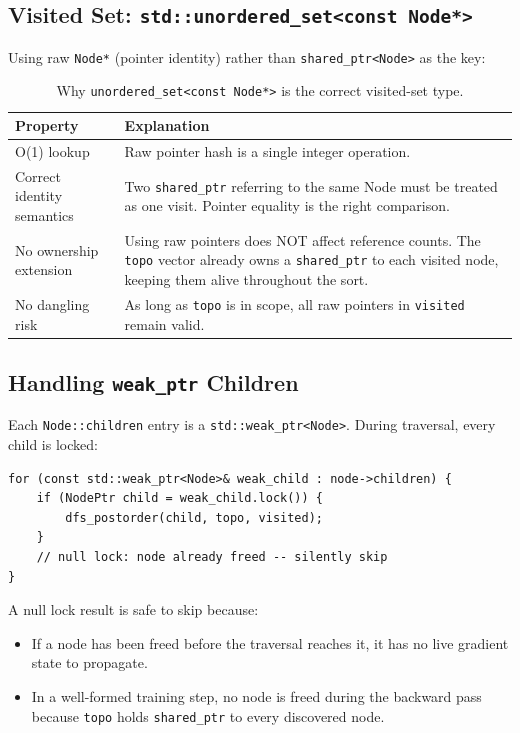 \documentclass[12pt, a4paper]{article}
\begin{document}
\subsection{Visited Set: \texttt{std::unordered\_set<const Node*>}}

Using raw \texttt{Node*} (pointer identity) rather than
\texttt{shared\_ptr<Node>} as the key:

\begin{table}[!ht]
\centering
\renewcommand{\arraystretch}{1.35}
\begin{tabularx}{\textwidth}{@{} l L @{}}
\toprule
\textbf{Property} & \textbf{Explanation} \\
\midrule
O(1) lookup
  & Raw pointer hash is a single integer operation. \\
Correct identity semantics
  & Two \texttt{shared\_ptr} referring to the same Node must be treated as
    one visit.  Pointer equality is the right comparison. \\
No ownership extension
  & Using raw pointers does NOT affect reference counts.  The \texttt{topo}
    vector already owns a \texttt{shared\_ptr} to each visited node,
    keeping them alive throughout the sort. \\
No dangling risk
  & As long as \texttt{topo} is in scope, all raw pointers in
    \texttt{visited} remain valid. \\
\bottomrule
\end{tabularx}
\caption{Why \texttt{unordered\_set<const Node*>} is the correct visited-set type.}
\end{table}

\subsection{Handling \texttt{weak\_ptr} Children}

Each \texttt{Node::children} entry is a \texttt{std::weak\_ptr<Node>}.
During traversal, every child is locked:

\begin{lstlisting}[caption={Safe weak\_ptr locking in dfs\_postorder}]
for (const std::weak_ptr<Node>& weak_child : node->children) {
    if (NodePtr child = weak_child.lock()) {
        dfs_postorder(child, topo, visited);
    }
    // null lock: node already freed -- silently skip
}
\end{lstlisting}

A null lock result is safe to skip because:
\begin{itemize}
  \item If a node has been freed before the traversal reaches it, it has no
        live gradient state to propagate.
  \item In a well-formed training step, no node is freed during the backward
        pass because \texttt{topo} holds \texttt{shared\_ptr} to every
        discovered node.
\end{itemize}
\end{document}
